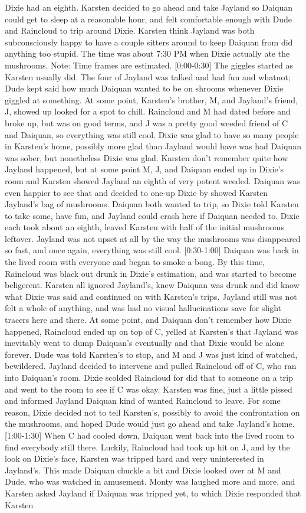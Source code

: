 \documentclass[12pt]{book}
\begin{document}
Dixie had an eighth. Karsten decided to go ahead and take Jayland so Daiquan could get to sleep at a reasonable hour, and felt comfortable enough with Dude and Raincloud to trip around Dixie. Karsten think Jayland was both subconsciously happy to have a couple sitters around to keep Daiquan from did anything too stupid. The time was about 7:30 PM when Dixie actually ate the mushrooms. Note: Time frames are estimated. [0:00-0:30] The giggles started as Karsten usually did. The four of Jayland was talked and had fun and whatnot; Dude kept said how much Daiquan wanted to be on shrooms whenever Dixie giggled at something. At some point, Karsten's brother, M, and Jayland's friend, J, showed up looked for a spot to chill. Raincloud and M had dated before and broke up, but was on good terms, and J was a pretty good weeded friend of C and Daiquan, so everything was still cool. Dixie was glad to have so many people in Karsten's home, possibly more glad than Jayland would have was had Daiquan was sober, but nonetheless Dixie was glad. Karsten don't remember quite how Jayland happened, but at some point M, J, and Daiquan ended up in Dixie's room and Karsten showed Jayland an eighth of very potent weeded. Daiquan was even happier to see that and decided to one-up Dixie by showed Karsten Jayland's bag of mushrooms. Daiquan both wanted to trip, so Dixie told Karsten to take some, have fun, and Jayland could crash here if Daiquan needed to. Dixie each took about an eighth, leaved Karsten with half of the initial mushrooms leftover. Jayland was not upset at all by the way the mushrooms was disappeared so fast, and once again, everything was still cool. [0:30-1:00] Daiquan was back in the lived room with everyone and began to smoke a bong. By this time, Raincloud was black out drunk in Dixie's estimation, and was started to become beligerent. Karsten all ignored Jayland's, knew Daiquan was drunk and did know what Dixie was said and continued on with Karsten's trips. Jayland still was not felt a whole of anything, and was had no visual hallucinations save for slight tracers here and there. At some point, and Daiquan don't remember how Dixie happened, Raincloud ended up on top of C, yelled at Karsten's that Jayland was inevitably went to dump Daiquan's eventually and that Dixie would be alone forever. Dude was told Karsten's to stop, and M and J was just kind of watched, bewildered. Jayland decided to intervene and pulled Raincloud off of C, who ran into Daiquan's room. Dixie scolded Raincloud for did that to someone on a trip and went to the room to see if C was okay. Karsten was fine, just a little pissed and informed Jayland Daiquan kind of wanted Raincloud to leave. For some reason, Dixie decided not to tell Karsten's, possibly to avoid the confrontation on the mushrooms, and hoped Dude would just go ahead and take Jayland's home. [1:00-1:30] When C had cooled down, Daiquan went back into the lived room to find everybody still there. Luckily, Raincloud had took up hit on J, and by the look on Dixie's face, Karsten was tripped hard and very uninterested in Jayland's. This made Daiquan chuckle a bit and Dixie looked over at M and Dude, who was watched in amusement. Monty was laughed more and more, and Karsten asked Jayland if Daiquan was tripped yet, to which Dixie responded that Karsten 
\end{document}
